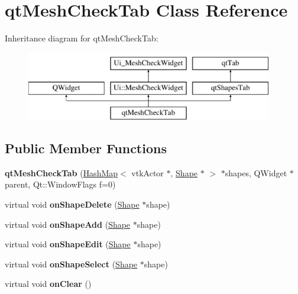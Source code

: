 \hypertarget{classqt_mesh_check_tab}{}\section{qt\+Mesh\+Check\+Tab Class Reference}
\label{classqt_mesh_check_tab}
Inheritance diagram for qt\+Mesh\+Check\+Tab\+:\begin{figure}[H]
\begin{center}
\leavevmode
\includegraphics[height=3.000000cm]{classqt_mesh_check_tab}
\end{center}
\end{figure}
\subsection*{Public Member Functions}
\begin{DoxyCompactItemize}
\item 
\hypertarget{classqt_mesh_check_tab_a8a976c8d86aabd648ca0397326b8e730}{}{\bfseries qt\+Mesh\+Check\+Tab} (\hyperlink{class_hash_map}{Hash\+Map}$<$ vtk\+Actor $\ast$, \hyperlink{class_shape}{Shape} $\ast$ $>$ $\ast$shapes, Q\+Widget $\ast$parent, Qt\+::\+Window\+Flags f=0)\label{classqt_mesh_check_tab_a8a976c8d86aabd648ca0397326b8e730}

\item 
\hypertarget{classqt_mesh_check_tab_aa1f583fbc0604f8c34528efd581e0633}{}virtual void {\bfseries on\+Shape\+Delete} (\hyperlink{class_shape}{Shape} $\ast$shape)\label{classqt_mesh_check_tab_aa1f583fbc0604f8c34528efd581e0633}

\item 
\hypertarget{classqt_mesh_check_tab_a8182eeedc7be66ea9d377011ace81125}{}virtual void {\bfseries on\+Shape\+Add} (\hyperlink{class_shape}{Shape} $\ast$shape)\label{classqt_mesh_check_tab_a8182eeedc7be66ea9d377011ace81125}

\item 
\hypertarget{classqt_mesh_check_tab_a01aea7b3fd612932b7a19b244b4b44a0}{}virtual void {\bfseries on\+Shape\+Edit} (\hyperlink{class_shape}{Shape} $\ast$shape)\label{classqt_mesh_check_tab_a01aea7b3fd612932b7a19b244b4b44a0}

\item 
\hypertarget{classqt_mesh_check_tab_a72ed8ca09f9100689a41dec77523bf4e}{}virtual void {\bfseries on\+Shape\+Select} (\hyperlink{class_shape}{Shape} $\ast$shape)\label{classqt_mesh_check_tab_a72ed8ca09f9100689a41dec77523bf4e}

\item 
\hypertarget{classqt_mesh_check_tab_a5ca41a6c3c905f572632a2b754f86b7c}{}virtual void {\bfseries on\+Clear} ()\label{classqt_mesh_check_tab_a5ca41a6c3c905f572632a2b754f86b7c}

\end{DoxyCompactItemize}

